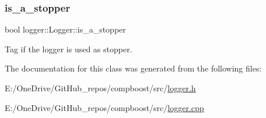\subsubsection{\texorpdfstring{is\+\_\+a\+\_\+stopper}{is\_a\_stopper}}
{\footnotesize\ttfamily bool logger\+::\+Logger\+::is\+\_\+a\+\_\+stopper\hspace{0.3cm}{\ttfamily [protected]}}



Tag if the logger is used as stopper. 



The documentation for this class was generated from the following files\+:\begin{DoxyCompactItemize}
\item 
E\+:/\+One\+Drive/\+Git\+Hub\+\_\+repos/compboost/src/\mbox{\hyperlink{logger_8h}{logger.\+h}}\item 
E\+:/\+One\+Drive/\+Git\+Hub\+\_\+repos/compboost/src/\mbox{\hyperlink{logger_8cpp}{logger.\+cpp}}\end{DoxyCompactItemize}
